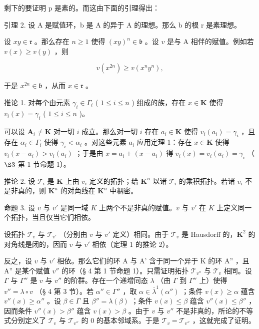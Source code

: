 剩下的要证明 p 是素的。而这由下面的引理得出：

引理 2. 设 A 是赋值环，b 是 A 的异于 A 的理想。那么 b 的根 r 是素理想。

设 \(xy \in \mathfrak{r}\) 。那么存在 \(n \geqslant 1\) 使得 \((xy)^n \in \mathfrak{b}\) 。设 \(v\) 是与 A 相伴的赋值。例如若 \(v(x) \geqslant v(y)\) ，则

\[
v (x ^ {2 n}) \geqslant v (x ^ {n} y ^ {n}),
\]

于是 \(x^{2n} \in \mathfrak{b}\) ，从而 \(x \in \mathfrak{r}\) 。

推论 1. 对每个由元素 \(\gamma_{i} \in \Gamma_{i}\) ( \(1 \leqslant i \leqslant n\) ) 组成的族，存在 \(x \in \mathbf{K}\) 使得 \(v_{i}(x) = \gamma_{i}\) ( \(1 \leqslant i \leqslant n\) )。

可以设 \(\mathbf{A}_i \neq \mathbf{K}\) 对一切 \(i\) 成立。那么对一切 \(i\) 存在 \(a_i \in \mathbf{K}\) 使得 \(v_i(a_i) = \gamma_i\) ，且存在 \(\alpha_i \in \Gamma_i\) 使得 \(\gamma_i < \alpha_i\) 。对这些元素 \(a_i\) 应用定理 1：存在 \(x \in \mathbf{K}\) 使得 \(v_i(x - a_i) > v_i(a_i)\) ；于是由 \(x = a_i + (x - a_i)\) 得 \(v_i(x) = v_i(a_i) = \gamma_i\) （ \(\S 3\) 第 1 节命题 1）。

推论 2. 设 \(\mathcal{T}_i\) 是 \(\mathbf{K}\) 上由 \(v_i\) 定义的拓扑；给 \(\mathbf{K}^n\) 以诸 \(\mathcal{T}_i\) 的乘积拓扑。若诸 \(v_i\) 不是非真的，则 \(\mathbf{K}^n\) 的对角线在 \(\mathbf{K}^n\) 中稠密。

命题 3. 设 \(v\) 与 \(v'\) 是同一域 \(K\) 上两个不是非真的赋值。\(v\) 与 \(v'\) 在 \(K\) 上定义同一个拓扑，当且仅当它们相依。

设拓扑 \(\mathcal{T}_v\) 与 \(\mathcal{T}_{v'}\) （分别由 \(v\) 与 \(v'\) 定义）相同。由于 \(\mathcal{T}_v\) 是 Hausdorff 的，\(\mathbf{K}^2\) 的对角线是闭的，因而 \(v\) 与 \(v'\) 相依（定理 1 的推论 2）。

反之，设 \(v\) 与 \(v'\) 相依。那么它们的环 A 与 A' 含于同一个异于 K 的环 A'' ，且 A'' 是某个赋值 \(v''\) 的环（§ 4 第 1 节命题 1）。只需证明拓扑 \(\mathcal{T}_{v''}\) 与 \(\mathcal{T}_v\) 相同。设 \(\Gamma\) 与 \(\Gamma''\) 是 \(v\) 与 \(v''\) 的阶群。存在一个递增同态 \(\lambda\) （由 \(\Gamma\) 到 \(\Gamma''\) 上）使得 \(v'' = \lambda \circ v\) （§ 4 第 3 节）。若 \(\alpha'' \in \Gamma''\) ，取 \(\alpha \in \overline{\lambda}^{1}(\alpha'')\) ；条件 \(v(x) \geqslant \alpha\) 蕴含 \(v''(x) \geqslant \alpha''\) 。设 \(\beta \in \Gamma\) 且 \(\beta'' = \lambda(\beta)\) ；条件 \(v(x) \leqslant \beta\) 蕴含 \(v''(x) \leqslant \beta''\) ，因而条件 \(v''(x) > \beta''\) 蕴含 \(v(x) > \beta\) 。由于 \(v\) 与 \(v''\) 不是非真的，所论的不等式分别定义了 \(\mathcal{T}_v\) 与 \(\mathcal{T}_{v''}\) 的 0 的基本邻域系。于是 \(\mathcal{T}_v = \mathcal{T}_{v''}\) ，这就完成了证明。

